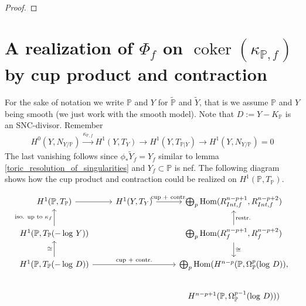 \documentclass[12pt, english]{article}
\DeclareMathOperator{\Hom}{Hom}
\DeclareMathOperator{\coker}{coker}
\begin{document}
\begin{proof}
\end{proof}
















\section{A realization of $\Phi_f$ on $\coker(\kappa_{\mathbb{P},f})$ by cup product and contraction} \label{section_ITT_on_coker_computation}


For the sake of notation we write $\mathbb{P}$ and $Y$ for $\tilde{\mathbb{P}}$ and $\tilde{Y}$, that is we assume $\mathbb{P}$ and $Y$ being smooth (we just work with the smooth model). Note that $D:= Y-K_{\mathbb{P}}$ is an SNC-divisor. Remember
\begin{align*}
	H^0(Y,N_{Y/\mathbb{P}}) \overset{\kappa_{\mathbb{P},f}}{\rightarrow} H^1(Y,T_Y) \rightarrow H^1(Y, T_{\mathbb{P} \vert{Y}}) \rightarrow H^1(Y,N_{Y/\mathbb{P}}) = 0
\end{align*}
The last vanishing follows since $\phi_* \tilde{Y}_f = Y_f$ similar to lemma \ref{toric_resolution_of_singularities} and $Y_f \subset \mathbb{P}$ is nef.
The following diagram shows how the cup product and contraction could be realized on $H^1(\mathbb{P}, T_{\mathbb{P}})$. 

\begin{equation*}
	\begin{tikzcd}
		H^1(\mathbb{P}, T_{\mathbb{P}}) \arrow{r} & H^1(Y,T_Y) \arrow{r}{\textrm{cup + contr.}} & \bigoplus_{p} \Hom(R_{Int,f}^{n-p+1}, R_{Int,f}^{n-p+2})  \\
		H^1(\mathbb{P}, T_{\mathbb{P}}(-\log \, Y)) \arrow{u}{\textrm{iso. up to } \kappa_f}
		&& \bigoplus_{p} \Hom(R_f^{n-p+1}, R_f^{n-p+2}) \arrow[swap]{u}{\textrm{restr.}} \arrow{d}{\cong} \\
		H^1(\mathbb{P}, T_{\mathbb{P}}(-\log \, D)) \arrow{u}{\cong} \arrow{rr}{\textrm{cup + contr.}} && \bigoplus_{p}  \Hom(H^{n-p}(\mathbb{P}, \Omega_{\mathbb{P}}^p(\log \, D)), \\
		&& H^{n-p+1}(\mathbb{P}, \Omega_{\mathbb{P}}^{p-1}(\log \, D))) 
	\end{tikzcd}
\end{equation*}
\end{document}
